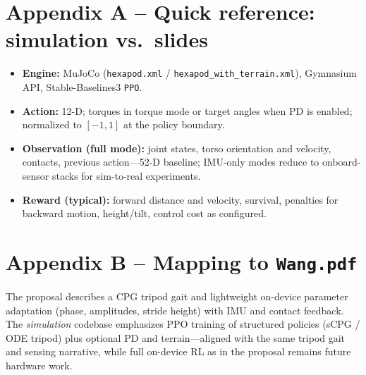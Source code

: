 \documentclass[11pt]{article}
\begin{document}
\section*{Appendix A -- Quick reference: simulation vs.\ slides}
\begin{itemize}
  \item \textbf{Engine:} MuJoCo (\texttt{hexapod.xml} / \texttt{hexapod\_with\_terrain.xml}), Gymnasium API, Stable-Baselines3 \texttt{PPO}.
  \item \textbf{Action:} 12-D; torques in torque mode or target angles when PD is enabled; normalized to $[-1,1]$ at the policy boundary.
  \item \textbf{Observation (full mode):} joint states, torso orientation and velocity, contacts, previous action---52-D baseline; IMU-only modes reduce to onboard-sensor stacks for sim-to-real experiments.
  \item \textbf{Reward (typical):} forward distance and velocity, survival, penalties for backward motion, height/tilt, control cost as configured.
\end{itemize}

\section*{Appendix B -- Mapping to \texttt{Wang.pdf}}
The proposal describes a CPG tripod gait and lightweight on-device parameter adaptation (phase, amplitudes, stride height) with IMU and contact feedback. The \emph{simulation} codebase emphasizes PPO training of structured policies (sCPG / ODE tripod) plus optional PD and terrain---aligned with the same tripod gait and sensing narrative, while full on-device RL as in the proposal remains future hardware work.
\end{document}
